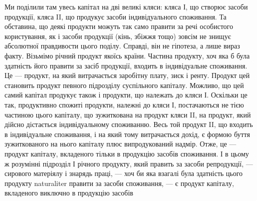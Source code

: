 Ми поділили там увесь капітал на дві великі кляси: кляса І, що створює
засоби продукції, кляса II, що продукує засоби індивідуального споживання.
Та обставина, що деякі продукти можуть так само правити за речі особистого
користування, як і засоби продукції (кінь, збіжжя тощо) зовсім не знищує абсолютної
правдивости цього поділу. Справді, він не гіпотеза, а лише вираз факту.
Візьмімо річний продукт якоїсь країни. Частина продукту, хоч яка б була здатність
його правити за засіб продукції, входить в індивідуальне споживання.
Це — продукт, на який витрачається заробітну плату, зиск і ренту. Продукт цей
становить продукт певного підрозділу суспільного капіталу. Можливо, що цей
самий капітал продукує також і продукти, що належать до кляси І. Оскільки
це так, продуктивно спожиті продукти, належні до кляси І, постачаються не
тією частиною цього капіталу, що зужиткована на продукт кляси II, на продукт,
який дійсно дістається індивідуальному споживанню. Весь той продукт
II, що входить в індивідуальне споживання, і на який тому витрачається
дохід, є формою буття зужиткованого на нього капіталу плюс випродукований
надмір. Отже, це — продукт капіталу, вкладеного тільки в продукцію
засобів споживання. І в цьому ж розумінні підрозділ І річного продукту, який
править за засоби репродукції, — сирового матеріялу і знарядь праці, — хоч би
яка взагалі була здатність цього продукту naturaliter правити за засоби споживання,
— є продукт капіталу, вкладеного виключно в продукцію засобів
\parbreak{}  %
